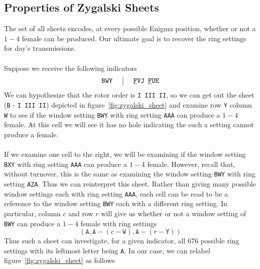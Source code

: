\subsection{Properties of Zygalski Sheets}
The set of all sheets encodes, at every possible Enigma position,
whether or not a $1-4$ female can be produced. Our ultimate goal is
to recover the ring settings for day's transmissions.
\\\\Suppose we receive the following indicators
\[
	\setlength{\arraycolsep}{15pt}
	\begin{array}{c | c}
		\texttt{BWY} & {\uline{\texttt{F}}}\texttt{VJ
		}{\uline{\texttt{F}}}\texttt{UE}              \\
	\end{array}
\]
We can hypothesize that the rotor order is \texttt{I III II}, so we
can get out the sheet (\texttt{B} - \texttt{I III II}) depicted in
figure~\ref{fig:zygalski_sheet} and examine row \texttt{Y} column
\texttt{W} to see if the window setting \texttt{BWY} with ring
setting \texttt{AAA} can produce a $1-4$ female. At this cell we will
see it has no hole indicating the such a setting cannot produce a female.
\\\\If we examine one cell to the right, we will be examining if the
window setting \texttt{BXY} with ring setting \texttt{AAA} can
produce a $1-4$ female. However, recall that, without turnover, this
is the same as examining the window setting \texttt{BWY} with ring
setting \texttt{AZA}. Thus we can reinterpret this sheet. Rather than
giving many possible window settings each with ring setting
\texttt{AAA}, each cell can be read to be a reference to the window
setting \texttt{BWY} each with a different ring setting. In
particular, column $c$ and row $r$ will give us whether or not a
window setting of \texttt{BWY} can produce a $1-4$ female with ring settings
\[
	(\texttt{A}, \texttt{A} - (c -\texttt{W}), \texttt{A} - (r -\texttt{Y}))
\]
Thus such a sheet can investigate, for a given indicator, all $676$
possible ring settings with its leftmost letter being \texttt{A}. In
our case, we can relabel figure~\ref{fig:zygalski_sheet} as follows
